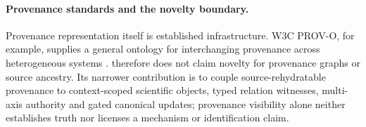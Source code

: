 \paragraph{Provenance standards and the novelty boundary.}
Provenance representation itself is established infrastructure. W3C PROV-O, for example, supplies a general ontology for interchanging provenance across heterogeneous systems \cite{w3cprov2013}. \RAKL{} therefore does not claim novelty for provenance graphs or source ancestry. Its narrower contribution is to couple source-rehydratable provenance to context-scoped scientific objects, typed relation witnesses, multi-axis authority and gated canonical updates; provenance visibility alone neither establishes truth nor licenses a mechanism or identification claim.
